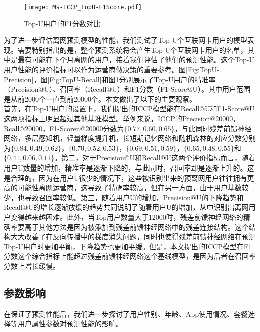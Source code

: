 \begin{figure}[hbt]
	\centering
	\texttt{[image: Ms-ICCP\_TopU-F1Score.pdf]}
	\caption{Top-U用户的F1分数对比}
	\label{Fig:TopU-F1Score}
\end{figure}
为了进一步评估离网预测模型的性能，我们测试了Top-U个互联网卡用户的模型表现。需要特别指出的是，整个预测系统将会产生Top-U个互联网卡用户的名单，其中是最有可能在下个月离网的用户，接着我们评估了他们的预测性能。这个Top-U用户性能的评价指标可以作为运营商做决策的重要参考。图\ref{Fig:TopU-Precision}，图\ref{Fig:TopU-Recall}和图\ref{Fig:TopU-F1Score}分别展示了Top-U用户的精准率（Precision@U）、召回率（Recall@U）和F1分数（F1-Score@U）。其中用户范围是从前2000个一直到前20000个。本文做出了以下的主要观察。\\
首先，在Top-U用户的设置下，我们提出的ICCP模型能在Recall@U和F1-Score@U这两项指标上明显超过其他基准模型。举例来说，ICCP的Precision@20000，Rcall@20000，F1-Scoren@20000分数为$\{ 0.77, 0.60, 0.65\}$，与此同时残差前馈神经网络，多层感知机，轻量梯度提升机，长短期记忆网络和随机森林的对应分数分别为$\{ 0.84, 0.49, 0.62\}$，$\{ 0.70, 0.52, 0.53\}$，$\{ 0.69, 0.51, 0.59\}$，$\{ 0.65, 0.48, 0.55\}$和$\{ 0.41, 0.06, 0.11\}$。第二，对于Precision@U和Recall@U这两个评价指标而言，随着用户U数量的增加，精准率是逐渐下降的，与此同时，召回率却是逐渐上升的。这是合理的，因为在用户U很少的情况下，这些被识别出来的预离网用户往往拥有更高的可能性离网运营商，这导致了精确率较高，但在另一方面，由于用户基数较少，也导致召回率较低。第三，随着用户U的增加，Precision@U的下降趋势和Recall@U的增长逐渐放缓的趋势共同说明了随着用户U的增加，从中识别出离网用户变得越来越困难。此外，当Top用户数量大于12000时，残差前馈神经网络的精确率要高于其他方法是因为被添加到残差前馈神经网络中的残差连接结构。这个结构大大改善了在反向传播中的梯度消失问题，同时也使得残差前馈神经网络在预测Top-U用户时更加平衡，下降趋势也更加平缓。但是，本文提出的ICCP模型在F1分数这个综合指标上能超过残差前馈神经网络这个基线模型，是因为后者在召回率分数上增长缓慢。







\subsection{参数影响}
在保证了预测性能后，我们进一步探讨了用户性别、年龄、App使用情况、套餐选择等用户属性参数对预测性能的影响。

